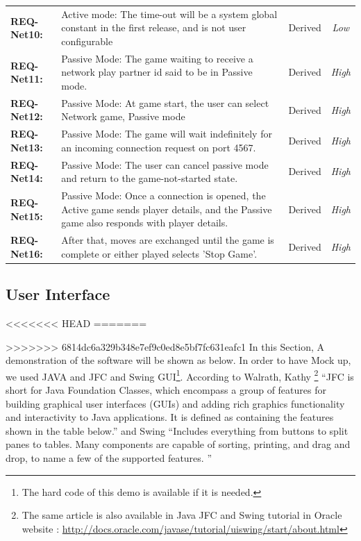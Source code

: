 \documentclass[a4paper,10pt]{article}
\begin{document}
\begin{table}[H]
\begin{tabular}{|| l | p{10.5cm}  |  c  | c ||}
\textbf{REQ-Net10:} &  
Active mode: The time-out will be a system global constant in the first release, and is not user configurable
& Derived  &  \textit{Low}\\

\textbf{REQ-Net11:} &  
Passive Mode: The game waiting to receive a network play partner id said to be in Passive mode.
& Derived  &  \textit{High}\\


\textbf{REQ-Net12:} &  
Passive Mode: At game start, the user can select Network game, Passive mode
& Derived  &  \textit{High}\\


\textbf{REQ-Net13:} &  
Passive Mode: The game will wait indefinitely for an incoming connection request on port 4567.
& Derived  &  \textit{High}\\


\textbf{REQ-Net14:} &  
Passive Mode: The user can cancel passive mode and return to the game-not-started state.
& Derived  &  \textit{High}\\


\textbf{REQ-Net15:} &  
Passive Mode: Once a connection is opened, the Active game sends player details, and the Passive game also responds with player details.
& Derived  &  \textit{High}\\


\textbf{REQ-Net16:} &  
After that, moves are exchanged until the game is complete or either played selects 'Stop Game'.
 & Derived  &  \textit{High}\\


\hline
\end{tabular}
\end{table}

\subsection{User Interface }
<<<<<<< HEAD
=======



>>>>>>> 6814dc6a329b348e7ef9c0ed8e5bf7fc631eafc1
In this Section, A demonstration of the software will be shown as below. In order to have Mock up, we used JAVA and JFC and Swing GUI\footnote{The hard code of this demo is available if it is needed.}. According to Walrath, Kathy \footnote{The same article is also available in Java JFC and Swing tutorial in Oracle website : \url{http://docs.oracle.com/javase/tutorial/uiswing/start/about.html}} ``JFC is short for Java Foundation Classes, which encompass a group of features for building graphical user interfaces (GUIs) and adding rich graphics functionality and interactivity to Java applications. It is defined as containing the features shown in the table below.'' and Swing ``Includes everything from buttons to split panes to tables. Many components are capable of sorting, printing, and drag and drop, to name a few of the supported features. '' \cite{walrath2004jfc} \\
\end{document}
